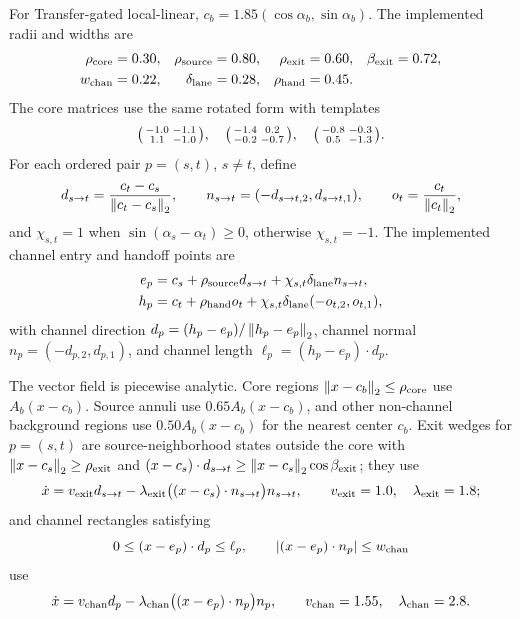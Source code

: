 For Transfer-gated local-linear, \(c_b=1.85(\cos\alpha_b,\sin\alpha_b)\).
The implemented radii and widths are
\[
\begin{aligned}
  \rho_{\rm core}&=0.30, &
  \rho_{\rm source}&=0.80, &
  \rho_{\rm exit}&=0.60, &
  \beta_{\rm exit}&=0.72,\\
  w_{\rm chan}&=0.22, &
  \delta_{\rm lane}&=0.28, &
  \rho_{\rm hand}&=0.45 .
\end{aligned}
\]
The core matrices use the same rotated form with templates
\[
\begin{psmallmatrix}-1.0&-1.1\\1.1&-1.0\end{psmallmatrix},\quad
\begin{psmallmatrix}-1.4&0.2\\-0.2&-0.7\end{psmallmatrix},\quad
\begin{psmallmatrix}-0.8&-0.3\\0.5&-1.3\end{psmallmatrix}.
\]
For each ordered pair \(p=(s,t)\), \(s\ne t\), define
\[
  d_{s\to t}=\frac{c_t-c_s}{\left\lVert c_t-c_s \right\rVert_2},\qquad
  n_{s\to t}=(-d_{s\to t,2},d_{s\to t,1}),\qquad
  o_t=\frac{c_t}{\left\lVert c_t \right\rVert_2},
\]
and \(\chi_{s,t}=1\) when \(\sin(\alpha_s-\alpha_t)\ge 0\), otherwise
\(\chi_{s,t}=-1\). The implemented channel entry and handoff points are
\[
\begin{aligned}
  e_p &= c_s+\rho_{\rm source}d_{s\to t}
        +\chi_{s,t}\delta_{\rm lane}n_{s\to t},\\
  h_p &= c_t+\rho_{\rm hand}o_t
        +\chi_{s,t}\delta_{\rm lane}(-o_{t,2},o_{t,1}),
\end{aligned}
\]
with channel direction \(d_p=(h_p-e_p)/\left\lVert h_p-e_p \right\rVert_2\), channel normal
\(n_p=(-d_{p,2},d_{p,1})\), and channel length
\(\ell_p=(h_p-e_p)\cdot d_p\).

The vector field is piecewise analytic. Core regions
\(\left\lVert x-c_b \right\rVert_2\le\rho_{\rm core}\) use \(A_b(x-c_b)\). Source annuli use
\(0.65A_b(x-c_b)\), and other non-channel background regions use
\(0.50A_b(x-c_b)\) for the nearest center \(c_b\). Exit wedges for
\(p=(s,t)\) are source-neighborhood states outside the core with
\(\left\lVert x-c_s \right\rVert_2\ge\rho_{\rm exit}\) and
\((x-c_s)\cdot d_{s\to t}\ge\left\lVert x-c_s \right\rVert_2\cos\beta_{\rm exit}\); they use
\[
  \dot x = v_{\rm exit}d_{s\to t}
  -\lambda_{\rm exit}\bigl((x-c_s)\cdot n_{s\to t}\bigr)n_{s\to t},
  \qquad
  v_{\rm exit}=1.0,\quad \lambda_{\rm exit}=1.8;
\]
and channel rectangles satisfying
\[
  0\le (x-e_p)\cdot d_p\le \ell_p,\qquad
  |(x-e_p)\cdot n_p|\le w_{\rm chan}
\]
use
\[
  \dot x = v_{\rm chan}d_p
  -\lambda_{\rm chan}\bigl((x-e_p)\cdot n_p\bigr)n_p,
  \qquad
  v_{\rm chan}=1.55,\quad \lambda_{\rm chan}=2.8.
\]

